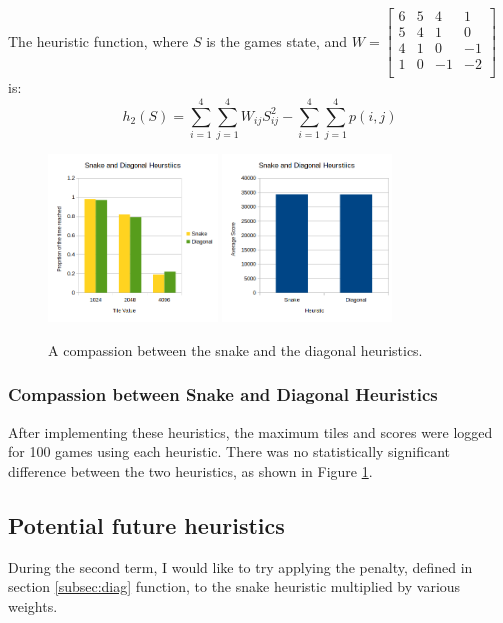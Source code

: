 \documentclass{article}
\begin{document}
The heuristic function, where $S$ is the games state, and
$
W=\begin{bmatrix}
    6&5&4&1\\
    5&4&1&0\\
    4&1&0&-1\\
    1&0&-1& -2\\
\end{bmatrix}
$ is:
\[
    h_2(S)=\sum_{i=1}^{4}\sum_{j=1}^{4}W_{ij}S_{ij}^2 - \sum_{i=1}^{4}\sum_{j=1}^{4}p(i,j)
\]
\begin{figure}
    \centering
    \includegraphics[width=0.4\textwidth]{SnakeToDiagonal.png}
    \includegraphics[width=0.4\textwidth]{SnakeToDiagonalScore.png}
    \caption{A compassion between the snake and the diagonal heuristics.}
    \label{fig:SnakeVDiagonal}
\end{figure}
\subsubsection{Compassion between Snake and Diagonal Heuristics}
After implementing these heuristics, the maximum tiles and scores were logged for 100 games using each heuristic. There was no statistically significant difference between the two heuristics, as shown in Figure \ref{fig:SnakeVDiagonal}. 



\subsection{Potential future heuristics}
During the second term, I would like to try applying the penalty, defined in section \ref{subsec:diag} function, to the snake heuristic multiplied by various weights.
\end{document}

